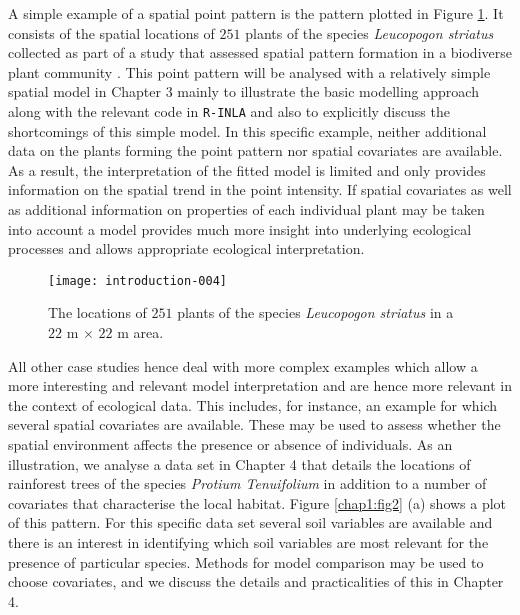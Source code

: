A simple example of a spatial point pattern is the pattern plotted in Figure \ref{chap1:fig1}. It consists of the spatial locations of $251$ plants of the species \textit{Leucopogon striatus} collected as part of a study that assessed spatial pattern formation in a biodiverse plant community \citep{armstrong:91}.  This point pattern will be analysed with a relatively simple spatial model in Chapter 3 mainly to illustrate the basic modelling approach along with the relevant code in \texttt{R-INLA} and also to explicitly discuss the shortcomings of this simple model.
In this specific example, neither additional data on the plants forming the point pattern nor spatial covariates are available. As a result, the interpretation of the fitted model is limited and only provides information on the spatial trend in the point intensity. If spatial covariates as well as additional information on properties of each individual plant may be taken into account a model provides much more insight into underlying ecological processes and allows appropriate ecological interpretation. 

\begin{figure}[h]
\begin{center}
\texttt{[image: introduction-004]}
\end{center}
\caption{The locations of $251$ plants of the species \textit{Leucopogon striatus} in a  $22\mbox{ m}$ $\times$ $22$ m area.}
\label{chap1:fig1}
\end{figure}

All other case studies hence deal with more complex examples which allow a more interesting and relevant model interpretation and are hence more relevant in the context of ecological data. This includes, for instance, an example for which several spatial covariates are available. These may be used to assess whether the spatial environment affects the presence or absence of individuals.  As an illustration, we analyse a data set in Chapter 4 that details the locations of rainforest trees of the species \textit{Protium Tenuifolium} in addition to a number of covariates that characterise the local habitat. Figure \ref{chap1:fig2} (a) shows a plot of this pattern.
For this specific data set several soil variables are available and there is an interest in identifying which soil variables are most relevant for the presence of particular species. Methods for model comparison may be used to choose covariates, and we discuss the details and practicalities of this in Chapter 4.

